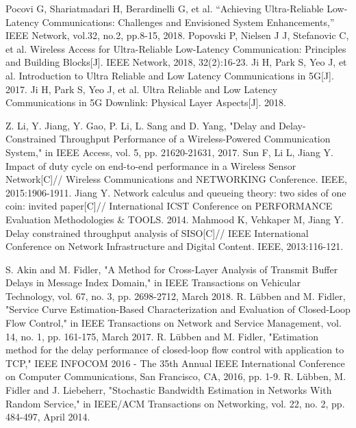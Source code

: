 \documentclass[conference]{IEEEtran}
\begin{document}
\begin{thebibliography}{00}
 Pocovi G, Shariatmadari H, Berardinelli G, et al. “Achieving Ultra-Reliable Low-Latency Communications: Challenges and Envisioned System Enhancements,” IEEE Network, vol.32, no.2, pp.8-15, 2018.
 Popovski P, Nielsen J J, Stefanovic C, et al. Wireless Access for Ultra-Reliable Low-Latency Communication: Principles and Building Blocks[J]. IEEE Network, 2018, 32(2):16-23.
 Ji H, Park S, Yeo J, et al. Introduction to Ultra Reliable and Low Latency Communications in 5G[J]. 2017.
 Ji H, Park S, Yeo J, et al. Ultra Reliable and Low Latency Communications in 5G Downlink: Physical Layer Aspects[J]. 2018.

 Z. Li, Y. Jiang, Y. Gao, P. Li, L. Sang and D. Yang, "Delay and Delay-Constrained Throughput Performance of a Wireless-Powered Communication System," in IEEE Access, vol. 5, pp. 21620-21631, 2017.
 Sun F, Li L, Jiang Y. Impact of duty cycle on end-to-end performance in a Wireless Sensor Network[C]// Wireless Communications and NETWORKING Conference. IEEE, 2015:1906-1911.
 Jiang Y. Network calculus and queueing theory: two sides of one coin: invited paper[C]// International ICST Conference on PERFORMANCE Evaluation Methodologies \& TOOLS. 2014.
 Mahmood K, Vehkaper M, Jiang Y. Delay constrained throughput analysis of SISO[C]// IEEE International Conference on Network Infrastructure and Digital Content. IEEE, 2013:116-121.

 S. Akin and M. Fidler, "A Method for Cross-Layer Analysis of Transmit Buffer Delays in Message Index Domain," in IEEE Transactions on Vehicular Technology, vol. 67, no. 3, pp. 2698-2712, March 2018.
 R. Lübben and M. Fidler, "Service Curve Estimation-Based Characterization and Evaluation of Closed-Loop Flow Control," in IEEE Transactions on Network and Service Management, vol. 14, no. 1, pp. 161-175, March 2017.
 R. Lübben and M. Fidler, "Estimation method for the delay performance of closed-loop flow control with application to TCP," IEEE INFOCOM 2016 - The 35th Annual IEEE International Conference on Computer Communications, San Francisco, CA, 2016, pp. 1-9.
 R. Lübben, M. Fidler and J. Liebeherr, "Stochastic Bandwidth Estimation in Networks With Random Service," in IEEE/ACM Transactions on Networking, vol. 22, no. 2, pp. 484-497, April 2014.


\end{thebibliography}
\end{document}
